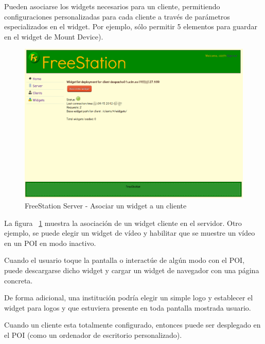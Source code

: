 Pueden asociarse los widgets necesarios para un cliente, permitiendo
configuraciones personalizadas para cada cliente a través de parámetros
especializados en el widget. Por ejemplo, sólo permitir 5 elementos para guardar
en el widget de Mount Device).

\newpage

\begin{figure}[ht]
    \begin{center}
        \includegraphics[scale=0.45]{src/img/freestation-server-associate-widget.png}
        \caption[FreeStation Server - Asociar un widget a un cliente] {FreeStation
        Server - Asociar un widget a un cliente}
        \label{fig:associateclient}
    \end{center}
\end{figure}

La figura ~\ref{fig:associateclient} muestra la asociación de un widget cliente 
en el servidor. Otro ejemplo, se puede elegir un widget de vídeo y habilitar que
se muestre un vídeo en un POI en modo inactivo.

Cuando el usuario toque la pantalla o interactúe de algún modo con el
POI, puede descargarse dicho widget y cargar un widget de navegador con
una página concreta.

De forma adicional, una institución podría elegir un simple logo y establecer el
widget para logos y que estuviera presente en toda pantalla mostrada usuario.

Cuando un cliente esta totalmente configurado, entonces puede ser desplegado
en el POI (como un ordenador de escritorio personalizado).

\newpage

